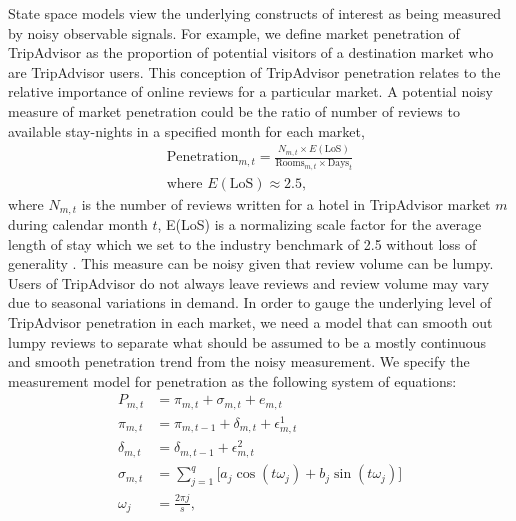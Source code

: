 \documentclass[mksc,blindrev]{informs3} %
\begin{document}
State space models view the underlying constructs of interest as being measured by noisy observable signals. For example, we define market penetration of TripAdvisor as the proportion of potential visitors of a destination market who are TripAdvisor users. This conception of TripAdvisor penetration relates to the relative importance of online reviews for a particular market. A potential noisy measure of market penetration could be the ratio of number of reviews to available stay-nights in a specified month for each market,
\begin{equation}\label{eq:penetration}
\begin{split}
\text{Penetration}_{m,t}=\frac{N_{m,t}\times E({\text{LoS}})}{\text{Rooms}_{m,t}\times \text{Days}_t} \\
\text{where } E({\text{LoS}})\approx 2.5,
\end{split}
\end{equation}
where $N_{m,t}$ is the number of reviews written for a hotel in TripAdvisor market $m$ during calendar month $t$, E(LoS) is a normalizing scale factor for the average length of stay which we set to the industry benchmark of 2.5 without loss of generality \citep{expediapackage2017}. This measure can be noisy given that review volume can be lumpy. Users of TripAdvisor do not always leave reviews and review volume may vary due to seasonal variations in demand. In order to gauge the underlying level of TripAdvisor penetration in each market, we need a model that can smooth out lumpy reviews to separate what should be assumed to be a mostly continuous and smooth penetration trend from the noisy measurement. We specify the measurement model for penetration as the following system of equations:
\begin{equation}\label{eq:penetration_dlm}
\begin{split}
P_{m,t}&=\pi_{m,t}+\sigma_{m,t}+e_{m,t}\\
\pi_{m,t}&=\pi_{m,t-1}+\delta_{m,t}+\epsilon_{m,t}^{1} \\
\delta_{m,t} &= \delta_{m,t-1} +\epsilon_{m,t}^{2} \\
\sigma_{m,t} &= \sum_{j=1}^{q}\big[a_j\cos(t\omega_j)+b_j\sin(t\omega_j)\big] \\
\omega_j &= \frac{2\pi j}{s},
\end{split}
\end{equation}
\end{document}
